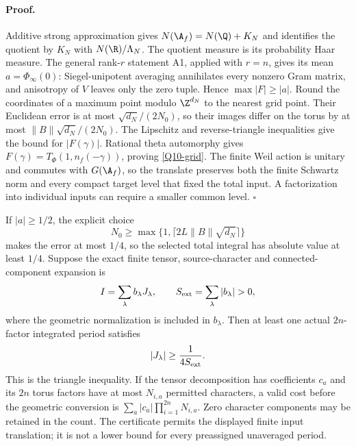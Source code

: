 \paragraph{Proof.}
Additive strong approximation gives
$N(\A_f)=N(\Q)+K_N$ and identifies the quotient by $K_N$
with $N(\R)/\Lambda_N$. The quotient measure is its probability
Haar measure. The general rank-$r$ statement A1, applied with
$r=n$, gives its mean $a=\Phi_\infty(0)$: Siegel-unipotent
averaging annihilates every nonzero Gram matrix, and anisotropy
of $V$ leaves only the zero tuple. Hence
$\max |F|\geq|a|$.
Round the coordinates of a maximum point modulo $\Z^{d_N}$ to
the nearest grid point. Their Euclidean error is at most
$\sqrt{d_N}/(2N_0)$, so their images differ on the torus by at
most $\|B\|\sqrt{d_N}/(2N_0)$. The Lipschitz and reverse-triangle
inequalities give the bound for $|F(\gamma)|$.
Rational theta automorphy gives
$F(\gamma)=T_\Phi(1,n_f(-\gamma))$, proving
\eqref{Q10-grid}. The finite Weil action is unitary and commutes
with $G(\A_f)$, so the translate preserves both the finite
Schwartz norm and every compact target level that fixed the total
input. A factorization into individual inputs can require a
smaller common level. \hfill$\square$

If $|a|\geq1/2$, the explicit choice
\[
 N_0\geq\max\{1,\lceil2L\|B\|\sqrt{d_N}\rceil\}
\]
makes the error at most $1/4$, so the selected total integral
has absolute value at least $1/4$. Suppose the exact finite
tensor, source-character and connected-component expansion is
\[
 I=\sum_\lambda b_\lambda J_\lambda,\qquad
 S_{\rm ext}=\sum_\lambda|b_\lambda|>0,
\]
where the geometric normalization is included in $b_\lambda$.
Then at least one actual $2n$-factor integrated period satisfies
\begin{equation}\label{Q10-extract}
 |J_\lambda|\geq\frac{1}{4S_{\rm ext}}.
\end{equation}
This is the triangle inequality. If the tensor decomposition has
coefficients $c_a$ and its $2n$ torus factors have at most
$N_{i,a}$ permitted characters, a valid cost before the geometric
conversion is
$\sum_a|c_a|\prod_{i=1}^{2n}N_{i,a}$.
Zero character components may be retained in the count. The
certificate permits the displayed finite input translation; it
is not a lower bound for every preassigned unaveraged period.


